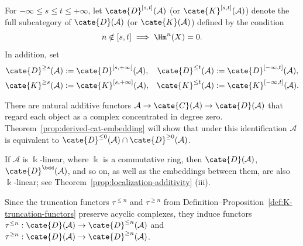 \begin{definition}
	For $-\infty \leq s \leq t \leq +\infty$, let
	$\cate{D}^{[s,t]}(\mathcal{A})$ (or $\cate{K}^{[s, t]}(\mathcal{A})$)
	denote the full subcategory of $\cate{D}(\mathcal{A})$ (or
	$\cate{K}(\mathcal{A})$) defined by the condition
	\[ n \notin [s, t] \implies \Hm^n(X) = 0 . \]
	In addition, set
	\begin{align*}
		\cate{D}^{\geq s}(\mathcal{A}) & := \cate{D}^{[s, +\infty]}(\mathcal{A}), &
		\cate{D}^{\leq t}(\mathcal{A}) & := \cate{D}^{[-\infty, t]}(\mathcal{A}), \\
		\cate{K}^{\geq s}(\mathcal{A}) & := \cate{K}^{[s, +\infty]}(\mathcal{A}), &
		\cate{K}^{\leq t}(\mathcal{A}) & := \cate{K}^{[-\infty, t]}(\mathcal{A}).
	\end{align*}
\end{definition}

There are natural additive functors
$\mathcal{A} \to \cate{C}(\mathcal{A}) \to \cate{D}(\mathcal{A})$ that
regard each object as a complex concentrated in degree zero.
Theorem~\ref{prop:derived-cat-embedding} will show that under this
identification $\mathcal{A}$ is equivalent to
$\cate{D}^{\leq 0}(\mathcal{A}) \cap \cate{D}^{\geq 0}(\mathcal{A})$.

\begin{remark}
	If $\mathcal{A}$ is $\Bbbk$-linear, where $\Bbbk$ is a commutative ring,
	then $\cate{D}(\mathcal{A})$, $\cate{D}^{\bdd}(\mathcal{A})$, and so on,
	as well as the embeddings between them, are also $\Bbbk$-linear; see
	Theorem~\ref{prop:localization-additivity} (iii).
\end{remark}

Since the truncation functors $\tau^{\leq n}$ and $\tau^{\geq n}$ from
Definition--Proposition~\ref{def:K-truncation-functors} preserve acyclic
complexes, they induce functors
$\tau^{\leq n}: \cate{D}(\mathcal{A}) \to
\cate{D}^{\leq n}(\mathcal{A})$ and
$\tau^{\geq n}: \cate{D}(\mathcal{A}) \to
\cate{D}^{\geq n}(\mathcal{A})$.

